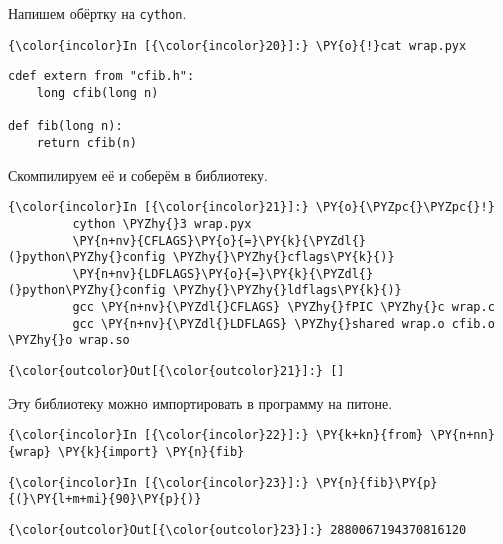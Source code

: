    Напишем обёртку на \texttt{cython}.

    \begin{Verbatim}[commandchars=\\\{\}]
{\color{incolor}In [{\color{incolor}20}]:} \PY{o}{!}cat wrap.pyx
\end{Verbatim}

    \begin{Verbatim}[commandchars=\\\{\}]
cdef extern from "cfib.h":
    long cfib(long n)

def fib(long n):
    return cfib(n)

    \end{Verbatim}

    Скомпилируем её и соберём в библиотеку.

    \begin{Verbatim}[commandchars=\\\{\}]
{\color{incolor}In [{\color{incolor}21}]:} \PY{o}{\PYZpc{}\PYZpc{}!}
         cython \PYZhy{}3 wrap.pyx
         \PY{n+nv}{CFLAGS}\PY{o}{=}\PY{k}{\PYZdl{}(}python\PYZhy{}config \PYZhy{}\PYZhy{}cflags\PY{k}{)}
         \PY{n+nv}{LDFLAGS}\PY{o}{=}\PY{k}{\PYZdl{}(}python\PYZhy{}config \PYZhy{}\PYZhy{}ldflags\PY{k}{)}
         gcc \PY{n+nv}{\PYZdl{}CFLAGS} \PYZhy{}fPIC \PYZhy{}c wrap.c
         gcc \PY{n+nv}{\PYZdl{}LDFLAGS} \PYZhy{}shared wrap.o cfib.o \PYZhy{}o wrap.so
\end{Verbatim}

            \begin{Verbatim}[commandchars=\\\{\}]
{\color{outcolor}Out[{\color{outcolor}21}]:} []
\end{Verbatim}
        
    Эту библиотеку можно импортировать в программу на питоне.

    \begin{Verbatim}[commandchars=\\\{\}]
{\color{incolor}In [{\color{incolor}22}]:} \PY{k+kn}{from} \PY{n+nn}{wrap} \PY{k}{import} \PY{n}{fib}
\end{Verbatim}

    \begin{Verbatim}[commandchars=\\\{\}]
{\color{incolor}In [{\color{incolor}23}]:} \PY{n}{fib}\PY{p}{(}\PY{l+m+mi}{90}\PY{p}{)}
\end{Verbatim}

            \begin{Verbatim}[commandchars=\\\{\}]
{\color{outcolor}Out[{\color{outcolor}23}]:} 2880067194370816120
\end{Verbatim}
        
